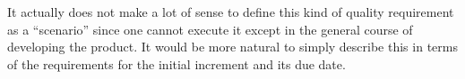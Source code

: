 \documentclass[letterpaper,11pt]{article}
\begin{document}
It actually does not make a lot of sense to define this kind of quality
requirement as a “scenario” since one cannot execute it except in the general
course of developing the product. It would be more natural to simply describe
this in terms of the requirements for the initial increment and its due date.



\end{document}
